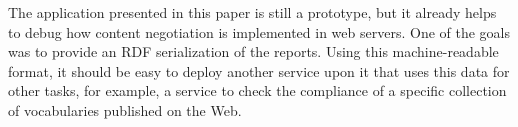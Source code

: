 \documentclass{../templates/llncs}
\begin{document}

The application presented in this paper is still a prototype, but  
it already helps to debug how content negotiation is implemented in web servers. One of the 
goals was to provide an RDF serialization of the reports. Using this machine-readable 
format, it should be easy to deploy another service upon it that uses this data for 
other tasks, for example, a service to check the compliance of a specific collection 
of vocabularies published on the Web.




\end{document}
